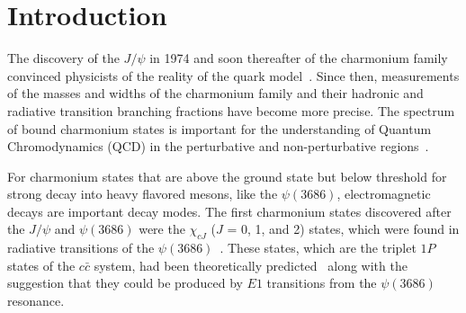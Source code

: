 \documentclass[aps,prd,twocolumn,showpacs,floatfix,byrevtex]{revtex4-1}
\begin{document}


\begin {abstract}
  Using a sample of 106 million $\psi(3686)$ decays, the branching
  fractions of $\psi(3686) \to \gamma \chi_{c0}, \psi(3686) \to \gamma
  \chi_{c1}$, and $\psi(3686) \to \gamma \chi_{c2}$ are measured with
  improved precision to be $(9.389 \pm 0.014 \pm 0.332)\,\%$, $(9.905 \pm
  0.011 \pm 0.353)\,\% $, and $(9.621 \pm 0.013 \pm 0.272)\,\% $,
  respectively, where the first uncertainties are statistical and the
  second ones are systematic.  The product branching fractions of
  $\psi(3686) \to \gamma \chi_{c1}, \chi_{c1} \to \gamma J/\psi$ and
  $\psi(3686) \to \gamma \chi_{c2}, \chi_{c2} \to \gamma J/\psi$ and
  the branching fractions of $\chi_{c1} \to \gamma J/\psi$ and
  $\chi_{c2} \to \gamma J/\psi$ are also presented.
\end{abstract}

\date{\today}

\maketitle


\section{Introduction}

The discovery of the $J/\psi$ in 1974 and soon thereafter of
the charmonium family convinced physicists of the reality of the quark
model~\cite{quarks}.  Since then, measurements of the masses
and widths of the charmonium family and their hadronic and radiative
transition branching fractions have become more precise.  The spectrum
of bound charmonium states is important for the understanding of
Quantum Chromodynamics (QCD) in the perturbative and non-perturbative
regions~\cite{M1}.

For charmonium states that are above the ground state but below
threshold for strong decay into heavy flavored mesons, like the
$\psi(3686)$, electromagnetic decays are important decay modes.  The
first charmonium states discovered after the $J/\psi$ and $\psi(3686)$
were the $\chi_{cJ}$ ($J$ = 0, 1, and 2) states, which were found in
radiative transitions of the $\psi(3686)$~\cite{disc1,disc2}.  These
states, which are the triplet $1P$ states of the $c\bar{c}$ system,
had been theoretically predicted~\cite{187,188} along with the
suggestion that they could be produced by $E1$ transitions from the
$\psi(3686)$ resonance.
\end{document}
